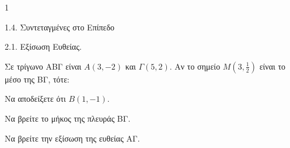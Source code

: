 \begin{ylh}{1}
    \item 1.4. Συντεταγμένες στο Επίπεδο
    \item 2.1. Εξίσωση Ευθείας.
\end{ylh}
Σε τρίγωνο ΑΒΓ είναι $A(3, -2)$ και $\Gamma(5, 2)$. Αν το σημείο $M\left(3, \frac{1}{2}\right)$ είναι το μέσο της ΒΓ, τότε:
\begin{alist}
    \item Να αποδείξετε ότι $B(1, -1)$. 
    \item Να βρείτε το μήκος της πλευράς ΒΓ. 
    \item Να βρείτε την εξίσωση της ευθείας ΑΓ. 
\end{alist}